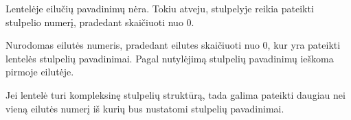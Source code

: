\documentclass[letterpaper,10pt,lithuanian]{sphinxmanual}
\begin{document}
\begin{fulllineitems}

\pysigstartsignatures
\pysigline
{}
\pysigstopsignatures{}

\begin{fulllineitems}
\label{\detokenize{formules:header}}
\pysigstartsignatures
\pysiglinewithargsret
{}
{}
{}
\pysigstopsignatures

\begin{fulllineitems}

\pysigstartsignatures
\pysigline
{}
\pysigstopsignatures
\sphinxAtStartPar
Lentelėje eilučių pavadinimų nėra. Tokiu atveju,
{\hyperref[\detokenize{dimensijos:property.source}]{}} stulpelyje reikia pateikti stulpelio numerį,
pradedant skaičiuoti nuo 0.

\end{fulllineitems}



\begin{fulllineitems}

\pysigstartsignatures
\pysigline
{}
\pysigstopsignatures
\sphinxAtStartPar
Nurodomas eilutės numeris, pradedant eilutes skaičiuoti nuo 0, kur
yra pateikti lentelės stulpelių pavadinimai. Pagal nutylėjimą
stulpelių pavadinimų ieškoma pirmoje eilutėje.

\end{fulllineitems}



\begin{fulllineitems}

\pysigstartsignatures
\pysigline
{}
\pysigstopsignatures
\sphinxAtStartPar
Jei lentelė turi kompleksinę stulpelių struktūrą, tada galima
pateikti daugiau nei vieną eilutės numerį iš kurių bus nustatomi
stulpelių pavadinimai.

\end{fulllineitems}


\end{fulllineitems}



\end{fulllineitems}
\end{document}
